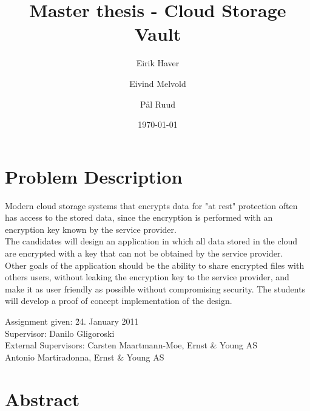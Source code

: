 \documentclass[pdftex,english,10pt,b5paper,twoside]{book}
\author{Eirik Haver \and Eivind Melvold \and Pål Ruud}
\title{Master thesis - Cloud Storage Vault}
\date{\today}
\begin{document}
\chapter*{Problem Description}
\thispagestyle{empty}
\pagestyle{empty}

Modern cloud storage systems that encrypts data for "at rest" protection often
has access to the stored data, since the encryption is performed with an
encryption key known by the service provider.\\

\noindent The candidates will design an application in which all data stored in
the cloud are encrypted with a key that can not be obtained by the service
provider.\\

\noindent Other goals of the application should be the ability to share
encrypted files with others users, without leaking the encryption key to the
service provider, and make it as user friendly as possible without compromising
security. The students will develop a proof of concept implementation of the
design.\\

\medskip\noindent
\begin{tabbing}
    Assignment given: \hspace{12pt} \= 24. January 2011 \\
    Supervisor: \> Danilo Gligoroski\\
    External Supervisors: \> Carsten Maartmann-Moe, Ernst \& Young AS\\
    \> Antonio Martiradonna, Ernst \& Young AS
\end{tabbing}

\chapter*{Abstract}
\pagestyle{plain}
\setcounter{page}{1}

%
\end{document}
